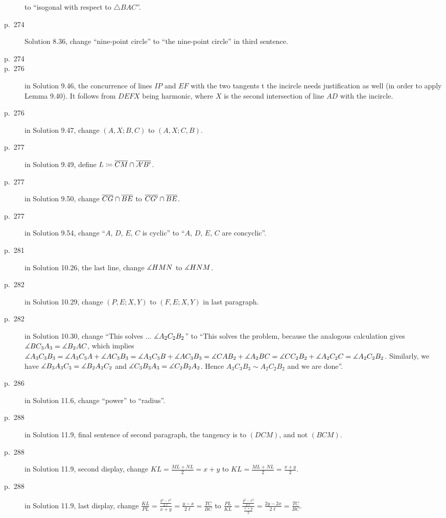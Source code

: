 \documentclass[11pt]{scrartcl}
\begin{document}
\begin{description}
  to ``isogonal with respect to $\triangle{BAC}$''.
\item[p.\  274] Solution 8.36, change ``nine-point circle''
  to ``the nine-point circle'' in third sentence.
\item[p.\  274] 
\item[p.\  276] in Solution 9.46, the concurrence of lines $IP$ and $EF$
  with the two tangents t the incircle needs justification as well
  (in order to apply Lemma 9.40). It follows from $DEFX$ being harmonic,
  where $X$ is the second intersection of line $AD$ with the incircle.
\item[p.\  276] in Solution 9.47, change $(A,X;B,C)$ to $(A,X;C,B)$.
\item[p.\  277] in Solution 9.49, define $L \coloneq \overline{CM} \cap \overline{A'B'}$.
\item[p.\  277] in Solution 9.50, change $\overline{CG} \cap \overline{BE}$ to $\overline{CG'} \cap \overline{BE}$.
\item[p.\  277] in Solution 9.54, change ``$A$, $D$, $E$, $C$ is cyclic'' to ``$A$, $D$, $E$, $C$ are concyclic''.
\item[p.\  281] in Solution 10.26, the last line, change $\measuredangle HMN$ to $\measuredangle HNM$.
\item[p.\  282] in Solution 10.29, change $(P,E;X,Y)$ to $(F,E;X,Y)$ in last paragraph.
\item[p.\  282] in Solution 10.30, change ``This solves ... $\measuredangle A_2C_2B_2$'' to
  ``This solves the problem, because the analogous calculation gives $\measuredangle BC_3A_3 = \measuredangle B_2AC$,
  which implies $\measuredangle A_3C_3B_3 = \measuredangle A_3C_3A + \measuredangle AC_3B_3 = \measuredangle A_3C_3B + \measuredangle AC_3B_3
  = \measuredangle CAB_2 + \measuredangle A_2BC = \measuredangle CC_2B_2 + \measuredangle A_2C_2C = \measuredangle A_2C_2B_2$.
  Similarly, we have $\measuredangle B_3A_3C_3 = \measuredangle B_2A_2C_2$ and $\measuredangle C_3B_3A_3 = \measuredangle C_2B_2A_2$.
  Hence $A_3C_3B_3 \sim A_2C_2B_2$ and we are done''.
\item[p.\  286] in Solution 11.6, change ``power'' to ``radius''.
\item[p.\  288] in Solution 11.9, final sentence of second paragraph,
  the tangency is to $(DCM)$, and not $(BCM)$.
\item[p.\  288] in Solution 11.9, second display, change $KL = \frac{ML + NL}{2} = x + y$ to $KL = \frac{ML + NL}{2} = \frac{x + y}{2}$.
\item[p.\  288] in Solution 11.9, last display, change $\frac{KL}{PL} = \frac{\frac{y^2 - x^2}{2\ell}}{x + y} = \frac{y - x}{2\ell} = \frac{TC}{BC}$ to $\frac{PL}{KL} = \frac{\frac{y^2 - x^2}{2\ell}}{\frac{x + y}{2}} = \frac{2y - 2x}{2\ell} = \frac{TC}{BC}$.

\end{description}
\end{document}
